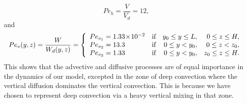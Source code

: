 \begin{equation}
	Pe_h = \frac{V}{V_{d}} = 12, 
\end{equation}
and
\begin{equation}
	Pe_{v}(y,z) =  \frac{W}{W_{d}(y,z)}=  \left\{
	\begin{array}{lrrr}
			Pe_{v_1} = 1.33\!\times\!10^{-2} & \mbox{if} & y_0 \le y \le L, & 0 \le z \le H,\\
			Pe_{v_2} = 13.3 & \mbox{if} & 0 \le y < y_0, & 0 \le z < z_0,\\
			Pe_{v_3} = 1.33 & \mbox{if} & 0 \le y < y_0, & z_0 \le z \le H.
	\end{array}
	\right.
\end{equation}
This shows that the advective and diffusive processes are of equal importance in the dynamics of our model, excepted in the zone of deep convection where the vertical diffusion dominates the vertical convection. This is because we have chosen to represent deep convection via a heavy vertical mixing in that zone. 